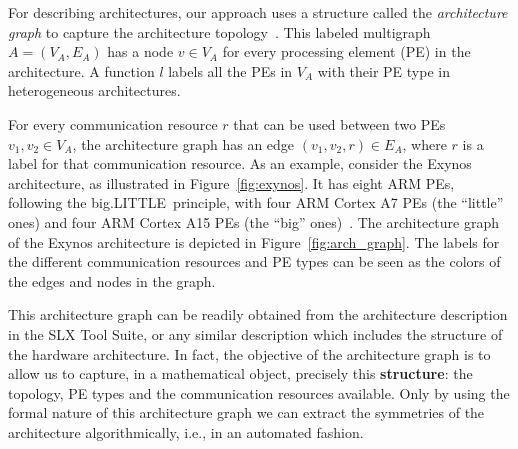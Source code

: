 \documentclass[sigplan,10pt]{acmart}
\begin{document}
For describing architectures, our approach uses a structure called the \emph{architecture graph} to capture the architecture topology~\cite{castrillon2012}.
This labeled multigraph $A = (V_A, E_A)$ has a node $v \in V_A$ for every processing element (PE) in the architecture.
A function $l$ labels all the PEs in $V_A$ with their PE type in heterogeneous architectures.

For every communication resource $r$ that can be used between two PEs $v_1, v_2 \in V_A$, the architecture graph has an edge $(v_1,v_2,r) \in E_A$, where $r$ is a label for that communication resource.
As an example, consider the Exynos architecture, as illustrated in Figure~\ref{fig:exynos}.
It has eight ARM PEs, following the big.LITTLE\texttrademark~principle, with four ARM Cortex A7 PEs (the ``little'' ones) and four ARM Cortex A15 PEs (the ``big'' ones)~\cite{biglittlewhitepaper}. 
The architecture graph of the Exynos architecture is depicted in Figure~\ref{fig:arch_graph}.
The labels for the different communication resources and PE types can be seen as the colors of the edges and nodes in the graph.

This architecture graph can be readily obtained from the architecture description in the SLX Tool Suite, or any similar description which includes the structure of the hardware architecture. 
In fact, the objective of the architecture graph is to allow us to capture, in a mathematical object, precisely this \textbf{structure}: the topology, PE types and the communication resources available.
Only by using the formal nature of this architecture graph we can extract the symmetries of the architecture algorithmically, i.e., in an automated fashion.
\end{document}
